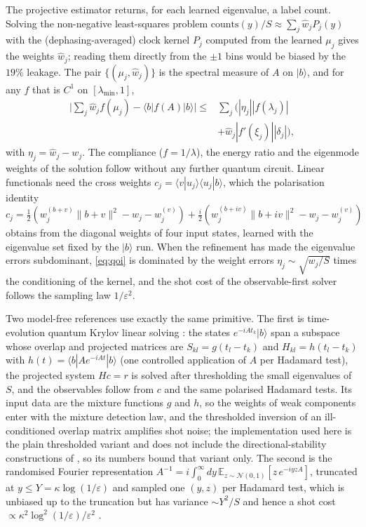 \documentclass[journal]{IEEEtran}
\newcommand{\lmin}{\lambda_{\min}}
\begin{document}
The projective estimator returns, for each learned eigenvalue, a label count. Solving the non-negative least-squares problem $\mathrm{counts}(y)/S\approx\sum_j\hat w_jP_j(y)$ with the (dephasing-averaged) clock kernel $P_j$ computed from the learned $\mu_j$ gives the weights $\hat w_j$; reading them directly from the $\pm1$ bins would be biased by the $19\%$ leakage. The pair $\{(\mu_j,\hat w_j)\}$ is the spectral measure of $A$ on $|b\rangle$, and for any $f$ that is $C^1$ on $[\lmin,1]$,
\begin{align}
\Big|\sum_j\hat w_jf(\mu_j)-\langle b|f(A)|b\rangle\Big|\le{}&\sum_j\big(|\eta_j||f(\lambda_j)|\nonumber\\
&+\hat w_j|f'(\xi_j)||\delta_j|\big),
\label{eq:qoi}
\end{align}
with $\eta_j=\hat w_j-w_j$. The compliance ($f=1/\lambda$), the energy ratio and the eigenmode weights of the solution follow without any further quantum circuit. Linear functionals need the cross weights $c_j=\langle v|u_j\rangle\langle u_j|b\rangle$, which the polarisation identity $c_j=\tfrac12(w^{(b+v)}_j\|b+v\|^2-w_j-w^{(v)}_j)+\tfrac i2(w^{(b+iv)}_j\|b+iv\|^2-w_j-w^{(v)}_j)$ obtains from the diagonal weights of four input states, learned with the eigenvalue set fixed by the $|b\rangle$ run. When the refinement has made the eigenvalue errors subdominant, \eqref{eq:qoi} is dominated by the weight errors $\eta_j\sim\sqrt{w_j/S}$ times the conditioning of the kernel, and the shot cost of the observable-first solver follows the sampling law $1/\varepsilon^2$.

Two model-free references use exactly the same primitive. The first is time-evolution quantum Krylov linear solving \cite{YuZhou2026,Park2026}: the states $e^{-iAt_k}|b\rangle$ span a subspace whose overlap and projected matrices are $S_{kl}=g(t_l-t_k)$ and $H_{kl}=h(t_l-t_k)$ with $h(t)=\langle b|Ae^{-iAt}|b\rangle$ (one controlled application of $A$ per Hadamard test), the projected system $Hc=r$ is solved after thresholding the small eigenvalues of $S$, and the observables follow from $c$ and the same polarised Hadamard tests. Its input data are the mixture functions $g$ and $h$, so the weights of weak components enter with the mixture detection law, and the thresholded inversion of an ill-conditioned overlap matrix amplifies shot noise; the implementation used here is the plain thresholded variant and does not include the directional-stability constructions of \cite{YuZhou2026}, so its numbers bound that variant only. The second is the randomised Fourier representation $A^{-1}=i\int_0^\infty dy\,\mathbb E_{z\sim\mathcal N(0,1)}[z\,e^{-iyzA}]$, truncated at $y\le Y=\kappa\log(1/\varepsilon)$ and sampled one $(y,z)$ per Hadamard test, which is unbiased up to the truncation but has variance $\sim Y^2/S$ and hence a shot cost $\propto\kappa^2\log^2(1/\varepsilon)/\varepsilon^2$ \cite{Hariprakash2025}.
\end{document}
